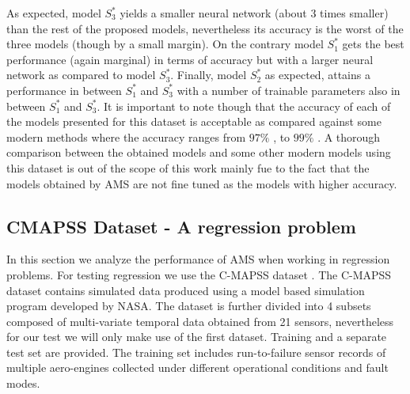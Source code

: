 \documentclass[journal]{IEEEtran}
\begin{document}
\begin{table}[!htb]
\begin{center}
\end{center}
\caption{Accuracy obtained by each of the top 3 models for MNIST dataset.}
\label{table:avg_accuracies_mnist}
\end{table}

As expected, model $S^*_3$ yields a smaller neural network (about 3 times smaller) than the rest of the proposed models, nevertheless its accuracy is the worst of the three models (though by a small margin). On the contrary model $S^*_1$ gets the best performance (again marginal) in terms of accuracy but with a larger neural network as compared to model $S^*_3$. Finally, model $S^*_2$ as expected, attains a performance in between $S^*_1$ and $S^*_3$ with a number of trainable parameters also in between $S^*_1$ and $S^*_3$. It is important to note though that the accuracy of each of the models presented for this dataset is acceptable as compared against some modern methods where the accuracy ranges from $97\%$ \cite{lecun-98}, to $99\%$ \cite{deng2011}. A thorough comparison between the obtained models and some other modern models using this dataset is out of the scope of this work mainly fue to the fact that the models obtained by AMS are not fine tuned as the models with higher accuracy.


\subsection{CMAPSS Dataset - A regression problem}

In this section we analyze the performance of AMS when working in regression problems. For testing regression we use the C-MAPSS dataset \cite{CMAPS2008}. The C-MAPSS dataset contains simulated data produced using a model based simulation program developed by NASA. The dataset is further divided into 4 subsets composed of multi-variate temporal data obtained from 21 sensors, nevertheless for our test we will only make use of the first dataset. Training and a separate test set are provided. The training set includes run-to-failure sensor records of multiple aero-engines collected under different operational conditions and fault modes.
\end{document}
